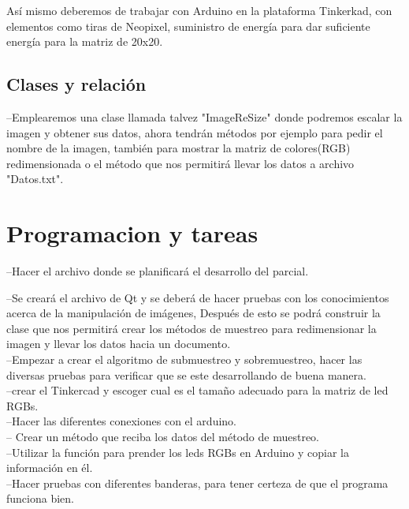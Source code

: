 \documentclass{article}
\begin{document}
Así mismo deberemos de trabajar con Arduino en la plataforma Tinkerkad, con elementos como tiras de Neopixel, suministro de energía para dar suficiente energía para la matriz de 20x20.\\

\subsection{Clases y relación} \label{contenido}

--Emplearemos una clase llamada talvez "ImageReSize" donde podremos escalar la imagen y obtener sus datos, ahora tendrán métodos por ejemplo para pedir el nombre de la imagen, también para mostrar la matriz de colores(RGB) redimensionada o el método que nos permitirá llevar los datos a archivo "Datos.txt".\\

\section{Programacion y tareas } \label{contenido}

--Hacer el archivo donde se planificará el desarrollo del parcial.

--Se creará el archivo de Qt y se deberá de hacer pruebas con los conocimientos acerca de la manipulación de imágenes, 
Después de esto se podrá construir la clase que nos permitirá crear los métodos de muestreo para redimensionar la imagen y llevar los datos hacia un documento.\\

--Empezar a crear el algoritmo de submuestreo y sobremuestreo, hacer las diversas pruebas para verificar que se este desarrollando de buena manera.\\

--crear el Tinkercad y escoger cual es el tamaño adecuado para la matriz de led RGBs.\\

--Hacer las diferentes conexiones con el arduino.\\

-- Crear un método que reciba los datos del método de muestreo.\\

--Utilizar la función para prender los leds RGBs en Arduino y copiar la información en él.\\

--Hacer pruebas con diferentes banderas, para tener certeza de que el programa funciona bien.\\
\end{document}
